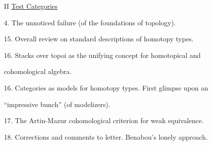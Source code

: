 II \uline{Test Categories}\par

4. The unnoticed failure (of the foundations of topology).\par
15. Overall review on standard descriptions of homotopy types.\par
16. Stacks over topoi as the unifying concept for homotopical and\par
cohomological algebra.\par
16. Categories as models for homotopy types. First glimpse upon an\par
``impressive bunch'' (of modelizers).\par
17. The Artin-Mazur cohomological criterion for weak equivalence.\par
18. Corrections and comments to letter. Benabou's lonely approach.\par

